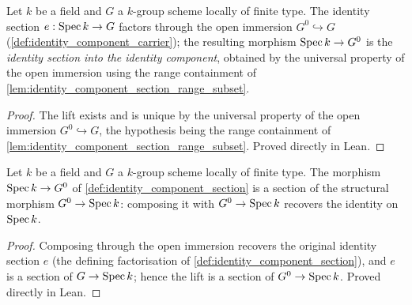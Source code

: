 \begin{definition}\leanok
  \label{def:identity_component_section}
  Let \(k\) be a field and \(G\) a \(k\)-group scheme locally of finite
  type. The identity section \(e : \operatorname{Spec} k \to G\) factors through the
  open immersion \(G^0 \hookrightarrow G\)
  (\cref{def:identity_component_carrier}); the resulting morphism
  \(\operatorname{Spec} k \to G^0\) is the \emph{identity section into the identity
  component}, obtained by the universal property of the open immersion
  using the range containment of
  \cref{lem:identity_component_section_range_subset}.
\end{definition}
\begin{proof}
  The lift exists and is unique by the universal property of the open
  immersion \(G^0 \hookrightarrow G\), the hypothesis being the range
  containment of \cref{lem:identity_component_section_range_subset}.
  Proved directly in Lean.
\end{proof}

\begin{lemma}\leanok
  \label{lem:identity_component_section_is_section}
  Let \(k\) be a field and \(G\) a \(k\)-group scheme locally of finite
  type. The morphism \(\operatorname{Spec} k \to G^0\) of
  \cref{def:identity_component_section} is a section of the structural
  morphism \(G^0 \to \operatorname{Spec} k\): composing it with \(G^0 \to \operatorname{Spec} k\)
  recovers the identity on \(\operatorname{Spec} k\).
\end{lemma}
\begin{proof}
  Composing through the open immersion recovers the original identity
  section \(e\) (the defining factorisation of
  \cref{def:identity_component_section}), and \(e\) is a section of
  \(G \to \operatorname{Spec} k\); hence the lift is a section of \(G^0 \to \operatorname{Spec} k\).
  Proved directly in Lean.
\end{proof}

